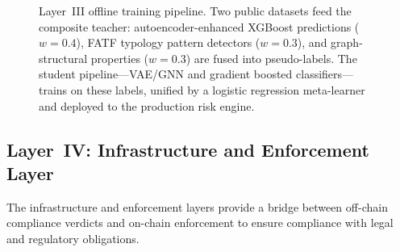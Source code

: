\documentclass[journal]{IEEEtran}
\begin{document}
\begin{figure}[!t]
{%
}%
\caption{Layer~III offline training pipeline. Two public datasets feed the composite teacher: autoencoder-enhanced XGBoost predictions ($w{=}0.4$), FATF typology pattern detectors ($w{=}0.3$), and graph-structural properties ($w{=}0.3$) are fused into pseudo-labels. The student pipeline---VAE/GNN and gradient boosted classifiers---trains on these labels, unified by a logistic regression meta-learner and deployed to the production risk engine.}
\label{fig:pipeline}
\end{figure}

\subsection{Layer~IV: Infrastructure and Enforcement Layer}

The infrastructure and enforcement layers provide a bridge between off-chain compliance verdicts and on-chain enforcement to ensure compliance with legal and regulatory obligations.
\end{document}
